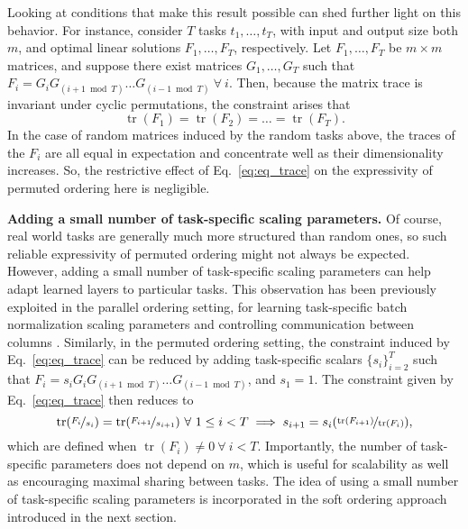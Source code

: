 \documentclass{article}
\theoremstyle{definition}
\theoremstyle{remark}
\DeclareMathOperator{\tr}{tr}
\begin{document}
Looking at conditions that make this result possible can shed further light on this behavior. For instance, consider $T$ tasks $t_1, \ldots , t_T$, with input and output size both $m$, and optimal linear solutions $F_1, \ldots , F_T$, respectively.
Let $F_1, \ldots , F_T$ be $m \times m$ matrices, and suppose there exist matrices $G_1, \ldots , G_T$ such that $F_i = G_iG_{(i+1\bmod T)} \ldots G_{(i-1 \bmod T)} \ \forall \ i$. Then, because the matrix trace is invariant under cyclic permutations, the constraint arises that 
\begin{equation} \label{eq:eq_trace}
\tr(F_1) = \tr(F_2) =  \ldots  = \tr(F_T).
\end{equation} 
In the case of random matrices induced by the random tasks above, the traces of the $F_i$ are all equal in expectation and concentrate well as their dimensionality increases.
So, the restrictive effect of Eq.~\ref{eq:eq_trace} on the expressivity of permuted ordering here is negligible.

\textbf{Adding a small number of task-specific scaling parameters. }
Of course, real world tasks are generally much more structured than random ones, so such reliable expressivity of permuted ordering might not always be expected.
However, adding a small number of task-specific scaling parameters can help adapt learned layers to particular tasks.
This observation has been previously exploited in the parallel ordering setting, for learning task-specific batch normalization scaling parameters \citep{Bilen:2017} and controlling communication between columns \citep{Misra:2016}.
Similarly, in the permuted ordering setting, the constraint induced by Eq.~\ref{eq:eq_trace} can be reduced by adding task-specific scalars $\{s_i\}_{i=2}^T$ such that $F_i = s_iG_iG_{(i+1\bmod T)} \ldots G_{(i-1 \bmod T)}$, and $s_1 = 1$. The constraint given by Eq.~\ref{eq:eq_trace} then reduces to 
\begin{equation} \label{eq:nonzero_trace}
\tr(\nicefrac{F_i}{s_i}) = \tr(\nicefrac{F_{i+1}}{s_{i+1}}) \ \forall \ 1 \leq i < T \\ \implies s_{i+1} = s_i( \nicefrac{\tr(F_{i+1})}{\tr(F_i)}),
\end{equation}
which are defined when $\tr(F_i) \neq 0 \ \forall \ i < T$.
Importantly, the number of task-specific parameters does not depend on $m$, which is useful for scalability as well as encouraging maximal sharing between tasks.
The idea of using a small number of task-specific scaling parameters is incorporated in the soft ordering approach introduced in the next section.
\end{document}
